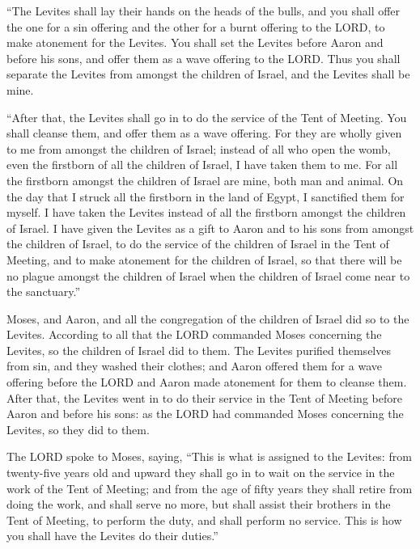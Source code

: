  ``The Levites shall lay their hands on the heads of the
bulls, and you shall offer the one for a sin offering and the other for
a burnt offering to the LORD, to make atonement for the Levites.
 You shall set the Levites before Aaron and before his
sons, and offer them as a wave offering to the LORD. 
Thus you shall separate the Levites from amongst the children of Israel,
and the Levites shall be mine.

 ``After that, the Levites shall go in to do the service
of the Tent of Meeting. You shall cleanse them, and offer them as a wave
offering.  For they are wholly given to me from amongst
the children of Israel; instead of all who open the womb, even the
firstborn of all the children of Israel, I have taken them to me.
 For all the firstborn amongst the children of Israel are
mine, both man and animal. On the day that I struck all the firstborn in
the land of Egypt, I sanctified them for myself.  I have
taken the Levites instead of all the firstborn amongst the children of
Israel.  I have given the Levites as a gift to Aaron and
to his sons from amongst the children of Israel, to do the service of
the children of Israel in the Tent of Meeting, and to make atonement for
the children of Israel, so that there will be no plague amongst the
children of Israel when the children of Israel come near to the
sanctuary.''

 Moses, and Aaron, and all the congregation of the
children of Israel did so to the Levites. According to all that the LORD
commanded Moses concerning the Levites, so the children of Israel did to
them.  The Levites purified themselves from sin, and they
washed their clothes; and Aaron offered them for a wave offering before
the LORD and Aaron made atonement for them to cleanse them.
 After that, the Levites went in to do their service in
the Tent of Meeting before Aaron and before his sons: as the LORD had
commanded Moses concerning the Levites, so they did to them.

 The LORD spoke to Moses, saying,  ``This
is what is assigned to the Levites: from twenty-five years old and
upward they shall go in to wait on the service in the work of the Tent
of Meeting;  and from the age of fifty years they shall
retire from doing the work, and shall serve no more,  but
shall assist their brothers in the Tent of Meeting, to perform the duty,
and shall perform no service. This is how you shall have the Levites do
their duties.''

